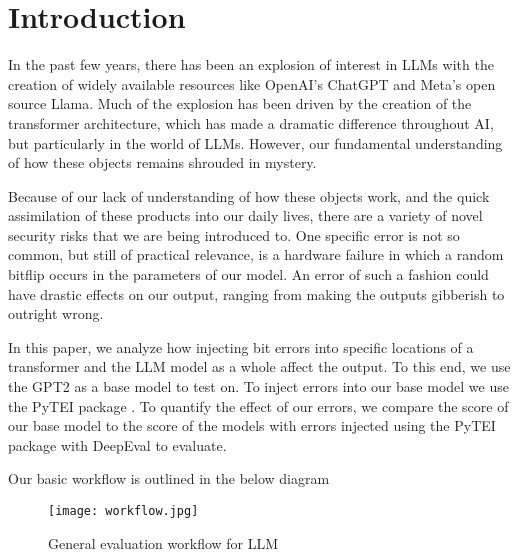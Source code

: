 \section{Introduction}
\label{sec:intro}

In the past few years, there has been an explosion of interest in LLMs with the creation of widely available resources like OpenAI's ChatGPT
and Meta's open source Llama. Much of the explosion has been driven by the creation of the transformer architecture, which has made a dramatic difference throughout AI, but particularly in the world of LLMs. However, our fundamental understanding of how these objects remains shrouded in mystery.

Because of our lack of understanding of how these objects work, and the quick assimilation of these products into our daily lives, there are a variety of novel security risks that we are being introduced to. One specific error is not so common, but still of practical relevance, is a hardware failure in which a random bitflip occurs in the parameters of our model. An error of such a fashion could have drastic effects on our output, ranging from making the outputs gibberish to outright wrong.

In this paper, we analyze how injecting bit errors into specific locations of a transformer and the LLM model as a whole affect the output. To this end, we use the GPT2 as a base model to test on. To inject errors into our base model we use the PyTEI package \cite{Ma23}. To quantify the effect of our errors, we compare the score of our base model to the score of the models with errors injected using the PyTEI package with DeepEval to evaluate.


Our basic workflow is outlined in the below diagram

\begin{figure}[ht]
	\begin{center}
		\texttt{[image: workflow.jpg]}
		\caption{General evaluation workflow for LLM}
		\label{workflow}
	\end{center}
\end{figure}






